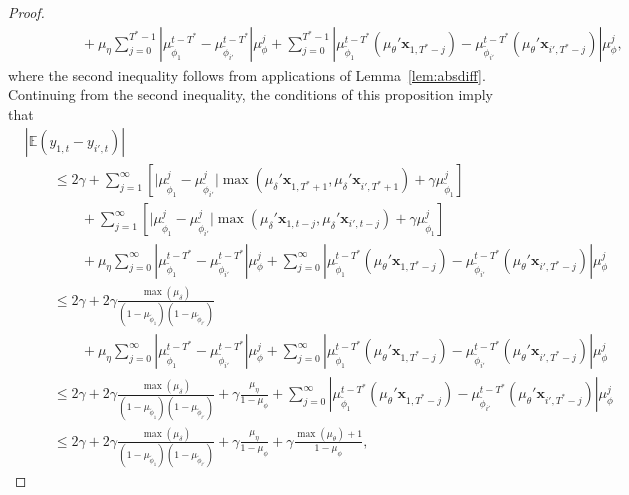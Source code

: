 \documentclass[11pt]{article}
\newcommand{\x}{\textbf{x}}
\def\E{\mathbb{E}} %
\theoremstyle{definition}
\begin{document}
\begin{proof}
\begin{align*}
  &\qquad\qquad + \mu_\eta\sum_{j=0}^{T^*-1}\left\vert \mu_{\tilde\phi_{1}}^{t - T^*} - \mu_{\tilde\phi_{i'}}^{t - T^*}\right\vert\mu_{\phi}^j + \sum_{j=0}^{T^*-1}\left\vert \mu_{\tilde\phi_{1}}^{t - T^*}(\mu_{\theta}'\x_{1,T^*-j}) - \mu_{\tilde\phi_{i'}}^{t - T^*}(\mu_{\theta}'\x_{i',T^*-j}) \right\vert\mu_{\phi}^j,  
\end{align*}
where the second inequality follows from applications of Lemma~\ref{lem:absdiff}. Continuing from the second inequality, the conditions of this proposition imply that
\begin{align*}
  &|\E(y_{1,t} - y_{i',t})| \\
  &\qquad\leq 2\gamma + \sum_{j=1}^{\infty}\left[\vert\mu_{\tilde\phi_{1}}^j - \mu_{\tilde\phi_{i'}}^j\vert\max(\mu_\delta'\x_{1,T^*+1},\mu_\delta'\x_{i',T^*+1}) + \gamma\mu_{\tilde\phi_{1}}^j\right] \\
  &\qquad\qquad + \sum_{j=1}^{\infty}\left[\vert\mu_{\tilde\phi_{1}}^j - \mu_{\tilde\phi_{i'}}^j\vert\max(\mu_\delta'\x_{1,t-j},\mu_\delta'\x_{i',t-j}) + \gamma\mu_{\tilde\phi_{1}}^j\right] \\
  &\qquad\qquad + \mu_\eta\sum_{j=0}^{\infty}\left\vert \mu_{\tilde\phi_{1}}^{t - T^*} - \mu_{\tilde\phi_{i'}}^{t - T^*}\right\vert\mu_{\phi}^j + \sum_{j=0}^{\infty}\left\vert \mu_{\tilde\phi_{1}}^{t - T^*}(\mu_{\theta}'\x_{1,T^*-j}) - \mu_{\tilde\phi_{i'}}^{t - T^*}(\mu_{\theta}'\x_{i',T^*-j}) \right\vert\mu_{\phi}^j  \\
  &\qquad\leq 2\gamma + 2\gamma\frac{\max(\mu_\delta)}{(1 - \mu_{\tilde\phi_{1}})(1 - \mu_{\tilde\phi_{i'}})} \\
  &\qquad\qquad + \mu_\eta\sum_{j=0}^{\infty}\left\vert \mu_{\tilde\phi_{1}}^{t - T^*} - \mu_{\tilde\phi_{i'}}^{t - T^*}\right\vert\mu_{\phi}^j + \sum_{j=0}^{\infty}\left\vert \mu_{\tilde\phi_{1}}^{t - T^*}(\mu_{\theta}'\x_{1,T^*-j}) - \mu_{\tilde\phi_{i'}}^{t - T^*}(\mu_{\theta}'\x_{i',T^*-j}) \right\vert\mu_{\phi}^j \\
  &\qquad\leq 2\gamma + 2\gamma\frac{\max(\mu_\delta)}{(1 - \mu_{\tilde\phi_{1}})(1 - \mu_{\tilde\phi_{i'}})} + \gamma\frac{\mu_{\eta}}{1 - \mu_{\phi}} + \sum_{j=0}^{\infty}\left\vert \mu_{\tilde\phi_{1}}^{t - T^*}(\mu_{\theta}'\x_{1,T^*-j}) - \mu_{\tilde\phi_{i'}}^{t - T^*}(\mu_{\theta}'\x_{i',T^*-j}) \right\vert\mu_{\phi}^j \\
  &\qquad\leq 2\gamma + 2\gamma\frac{\max(\mu_\delta)}{(1 - \mu_{\tilde\phi_{1}})(1 - \mu_{\tilde\phi_{i'}})} + \gamma\frac{\mu_{\eta}}{1 - \mu_{\phi}} + \gamma\frac{\max(\mu_\theta) + 1}{1 - \mu_\phi}, 
\end{align*}  

\end{proof}
\end{document}
